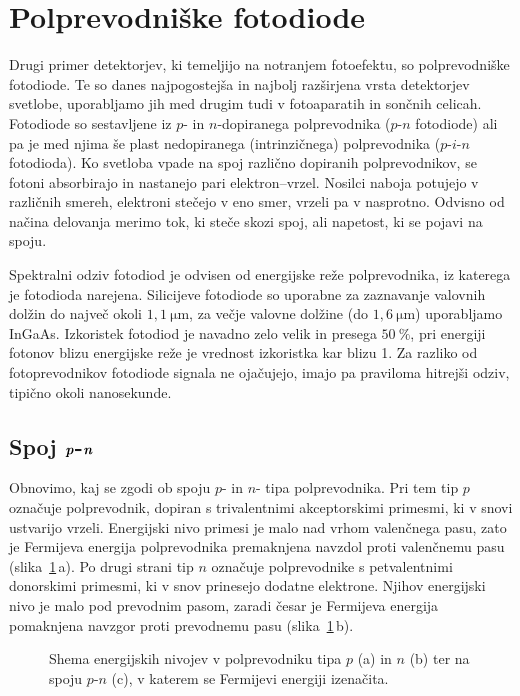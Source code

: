 \section{Polprevodniške fotodiode}
Drugi primer detektorjev, ki temeljijo na notranjem fotoefektu,
so polprevodniške fotodiode.
Te so danes najpogostejša in najbolj razširjena vrsta detektorjev svetlobe, uporabljamo jih med
drugim tudi v fotoaparatih in sončnih celicah. Fotodiode so sestavljene iz $p$- in $n$-dopiranega 
polprevodnika ($p$-$n$ fotodiode) ali pa je med njima še plast nedopiranega (intrinzičnega) 
polprevodnika ($p$-$i$-$n$ fotodioda). Ko svetloba vpade na spoj različno dopiranih polprevodnikov,
se fotoni absorbirajo in nastanejo 
pari elektron--vrzel. Nosilci naboja potujejo v različnih smereh, elektroni stečejo v eno smer,
vrzeli pa v nasprotno. Odvisno od načina delovanja merimo tok, ki steče skozi 
spoj, ali napetost, ki se pojavi na spoju. 

Spektralni odziv 
fotodiod je odvisen od energijske reže polprevodnika, 
iz katerega je fotodioda narejena.
Silicijeve  fotodiode so  uporabne za zaznavanje valovnih dolžin do največ okoli
$1,1~\si{\micro\meter}$, za večje valovne dolžine (do $1,6~\si{\micro\meter}$) 
uporabljamo InGaAs. Izkoristek fotodiod
je navadno zelo velik in presega $50~\%$, pri energiji fotonov blizu energijske reže 
je vrednost izkoristka kar blizu 1.
Za razliko od fotoprevodnikov fotodiode signala
ne ojačujejo, imajo pa praviloma hitrejši odziv, tipično okoli nanosekunde.

\subsection*{Spoj $\textbf{\textit{p}}$-$\textbf{\textit{n}}$}
Obnovimo, kaj se zgodi ob spoju $p$- in $n$- tipa polprevodnika. Pri tem tip $p$ označuje
polprevodnik, dopiran s trivalentnimi akceptorskimi primesmi, ki v snovi ustvarijo vrzeli.
Energijski nivo primesi je malo nad vrhom valenčnega pasu, zato je Fermijeva energija
polprevodnika premaknjena navzdol proti valenčnemu pasu (slika~\ref{11_PN1}\,a). 
Po drugi strani tip $n$ označuje polprevodnike s petvalentnimi 
donorskimi primesmi, ki v snov prinesejo dodatne elektrone. Njihov energijski nivo je malo 
pod prevodnim pasom, zaradi česar je Fermijeva energija pomaknjena navzgor proti prevodnemu pasu
(slika~\ref{11_PN1}\,b).
\begin{figure}[h]
\centering
\def\svgwidth{140truemm} 

\caption{Shema energijskih nivojev v polprevodniku tipa $p$ (a) in $n$ (b) ter na spoju $p$-$n$ (c), 
v katerem se Fermijevi energiji izenačita.}
\label{11_PN1}
\end{figure}

